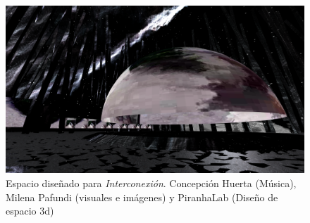 \begin{figure}
  \includegraphics[width=\textwidth]{img/figura6.png}
  \caption{Espacio diseñado para \emph{Interconexión}. Concepción Huerta (Música), Milena Pafundi (visuales e imágenes) y PiranhaLab (Diseño de espacio 3d)}
  \label{fig:interconexion}
\end{figure}

